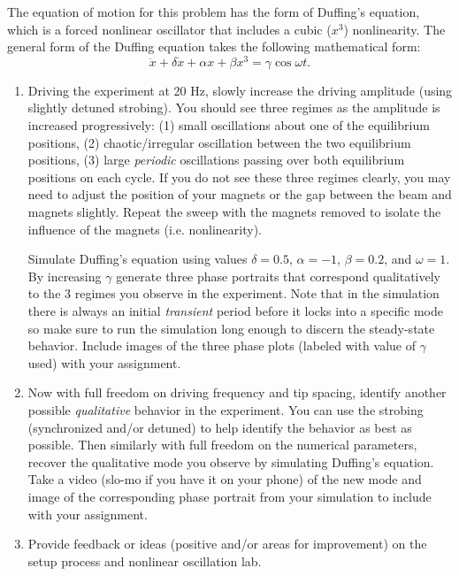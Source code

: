 \documentclass[12pt,letterpaper,english]{article}
\begin{document}
The equation of motion for this problem has the form of Duffing's equation, which is a forced nonlinear oscillator that includes a cubic ($x^3$) nonlinearity.  The general form of the Duffing equation takes the following mathematical form:
\begin{equation}
\ddot{x}+\delta \dot{x} +\alpha x + \beta x^3 = \gamma \cos \omega t \nonumber.
\end{equation}
\begin{enumerate}[resume]
\item Driving the experiment at 20 Hz, slowly increase the driving amplitude (using slightly detuned strobing).  You should see three regimes as the amplitude is increased progressively: (1) small oscillations about one of the equilibrium positions, (2) chaotic/irregular oscillation between the two equilibrium positions, (3) large \emph{periodic} oscillations passing over both equilibrium positions on each cycle.  If you do not see these three regimes clearly, you may need to adjust the position of your magnets or the gap between the beam and magnets slightly.  Repeat the sweep with the magnets removed to isolate the influence of the magnets (i.e. nonlinearity).

\vspace{0.05in}

Simulate Duffing's equation using values $\delta=0.5$, $\alpha=-1$, $\beta = 0.2$, and $\omega=1$.  By increasing $\gamma$ generate three phase portraits that correspond qualitatively to the 3 regimes you observe in the experiment.  Note that in the simulation there is always an initial \emph{transient} period before it locks into a specific mode so make sure to run the simulation long enough to discern the steady-state behavior.  Include images of the three phase plots (labeled with value of $\gamma$ used) with your assignment.

\item Now with full freedom on driving frequency and tip spacing, identify another possible \emph{qualitative} behavior in the experiment.  You can use the strobing (synchronized and/or detuned) to help identify the behavior as best as possible.  Then similarly with full freedom on the numerical parameters, recover the qualitative mode you observe by simulating Duffing's equation.  Take a video (slo-mo if you have it on your phone) of the new mode and image of the corresponding phase portrait from your simulation to include with your assignment.

\item Provide feedback or ideas (positive and/or areas for improvement) on the setup process and nonlinear oscillation lab. 

\end{enumerate}
\end{document}
